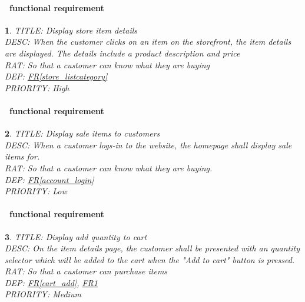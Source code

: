 \documentclass{scrreprt}
\theoremstyle{funreq}
\newtheorem{funreq}{}
\newcommand*{\reqref}[1]{\hyperref[#1]{FR\ref*{#1}}}
\begin{document}
\paragraph[]{\Subsectionname ~functional requirement }
\begin{funreq}
	\label{store_details}
	TITLE: Display store item details\\
	DESC: When the customer clicks on an item on the storefront, the item details are displayed.  The details include a product description and price\\
	RAT: So that a customer can know what they are buying\\
	DEP: \reqref{store_listcategory}\\
	PRIORITY: High\\
\end{funreq}

\paragraph[]{\Subsectionname ~functional requirement }
\begin{funreq}
	\label{store_displaysales}
	TITLE: Display sale items to customers\\
	DESC: When a customer logs-in to the website, the homepage shall display sale items for.\\
	RAT: So that a customer can know what they are buying.\\
	DEP: \reqref{account_login}\\
	PRIORITY: Low\\
\end{funreq}

\paragraph[]{\Subsectionname ~functional requirement }
\begin{funreq}
	\label{store_detailscart}
	TITLE: Display add quantity to cart\\
	DESC: On the item details page, the customer shall be presented with an quantity selector which will be added to the cart when the "Add to cart" button is pressed.\\
	RAT: So that a customer can purchase items\\
	DEP: \reqref{cart_add}, \reqref{store_details}\\
	PRIORITY: Medium\\
\end{funreq}
\end{document}
